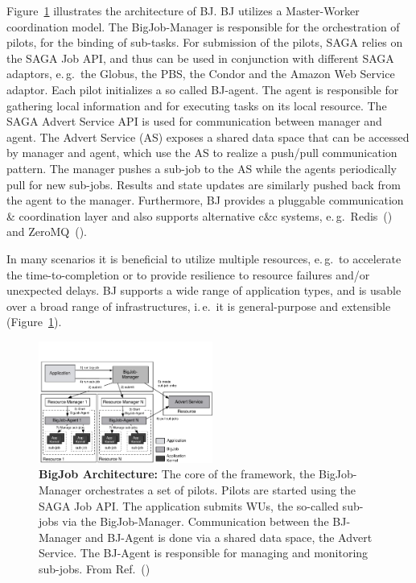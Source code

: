 \documentclass{sig-alternate}
\begin{document}
Figure~\ref{fig:figures_re_bigjob_interactions} illustrates the
architecture of BJ. BJ utilizes a Master-Worker coordination
model. The BigJob-Manager is responsible for the orchestration of
pilots, for the binding of sub-tasks. For submission of the pilots,
SAGA relies on the SAGA Job API, and thus can be used in conjunction
with different SAGA adaptors, e.\,g.\ the Globus, the PBS, the Condor
and the Amazon Web Service adaptor. Each pilot initializes a so called
BJ-agent. The agent is responsible for gathering local information and
for executing tasks on its local resource. The SAGA Advert Service API
is used for communication between manager and agent. The Advert
Service (AS) exposes a shared data space that can be accessed by
manager and agent, which use the AS to realize a push/pull
communication pattern.  The manager pushes a sub-job to the AS while
the agents periodically pull for new sub-jobs. Results and state
updates are similarly pushed back from the agent to the
manager. Furthermore, BJ provides a pluggable communication \&
coordination layer and also supports alternative c\&c systems,
e.\,g.\ Redis~(\cite{redis}) and ZeroMQ~(\cite{zmq}).

In many scenarios it is beneficial to utilize multiple resources,
e.\,g.\ to accelerate the time-to-completion or to provide resilience
to resource failures and/or unexpected delays.  BJ supports a wide
range of application types, and is usable over a broad range of
infrastructures, i.\,e.\ it is general-purpose and extensible
(Figure~\ref{fig:figures_re_bigjob_interactions}). 


\begin{figure}[t]
  \centering
  \includegraphics[width=0.51\textwidth]{./figs/re_bigjob_interactions}
   \caption{\textbf{BigJob Architecture:} The core of the framework,
     the BigJob-Manager orchestrates a set of pilots. Pilots are
     started using the SAGA Job API. The application submits WUs, the
     so-called sub-jobs via the BigJob-Manager. Communication between
     the BJ-Manager and BJ-Agent is done via a shared data space, the
     Advert Service. The BJ-Agent is responsible for managing and
     monitoring sub-jobs. From Ref.~(\cite{saga_bigjob_condor_cloud})}
        \label{fig:figures_re_bigjob_interactions}
\end{figure}
\end{document}
